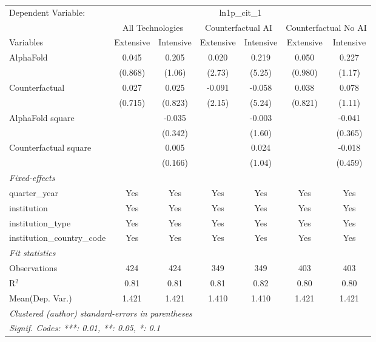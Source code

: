 \begingroup
\centering
\begin{tabular}{lcccccc}
   \tabularnewline \midrule \midrule
   Dependent Variable: & \multicolumn{6}{c}{ln1p\_cit\_1}\\
 & \multicolumn{2}{c}{All Technologies} & \multicolumn{2}{c}{Counterfactual AI} & \multicolumn{2}{c}{Counterfactual No AI} \\
\cmidrule(lr){1-1}\cmidrule(lr){2-3} \cmidrule(lr){4-5} \cmidrule(lr){6-7}
Variables & \multicolumn{1}{c}{Extensive} & \multicolumn{1}{c}{Intensive} & \multicolumn{1}{c}{Extensive} & \multicolumn{1}{c}{Intensive} & \multicolumn{1}{c}{Extensive} & \multicolumn{1}{c}{Intensive} \\
\cmidrule(lr){1-1}\cmidrule(lr){2-2} \cmidrule(lr){3-3} \cmidrule(lr){4-4} \cmidrule(lr){5-5} \cmidrule(lr){6-6} \cmidrule(lr){7-7}
   AlphaFold                    & 0.045   & 0.205   & 0.020  & 0.219  & 0.050   & 0.227\\   
                                & (0.868) & (1.06)  & (2.73) & (5.25) & (0.980) & (1.17)\\   
   Counterfactual               & 0.027   & 0.025   & -0.091 & -0.058 & 0.038   & 0.078\\   
                                & (0.715) & (0.823) & (2.15) & (5.24) & (0.821) & (1.11)\\   
   AlphaFold square             &         & -0.035  &        & -0.003 &         & -0.041\\   
                                &         & (0.342) &        & (1.60) &         & (0.365)\\   
   Counterfactual square        &         & 0.005   &        & 0.024  &         & -0.018\\   
                                &         & (0.166) &        & (1.04) &         & (0.459)\\   
   \midrule
   \emph{Fixed-effects}\\
   quarter\_year                & Yes     & Yes     & Yes    & Yes    & Yes     & Yes\\  
   institution                  & Yes     & Yes     & Yes    & Yes    & Yes     & Yes\\  
   institution\_type            & Yes     & Yes     & Yes    & Yes    & Yes     & Yes\\  
   institution\_country\_code   & Yes     & Yes     & Yes    & Yes    & Yes     & Yes\\  
   \midrule
   \emph{Fit statistics}\\
   Observations                 & 424     & 424     & 349    & 349    & 403     & 403\\  
   R$^2$                        & 0.81    & 0.81    & 0.81   & 0.82   & 0.80    & 0.80\\  
Mean(Dep. Var.) & 1.421 & 1.421 & 1.410 & 1.410 & 1.421 & 1.421 \\
   \midrule \midrule
   \multicolumn{7}{l}{\emph{Clustered (author) standard-errors in parentheses}}\\
   \multicolumn{7}{l}{\emph{Signif. Codes: ***: 0.01, **: 0.05, *: 0.1}}\\
\end{tabular}
\par\endgroup
